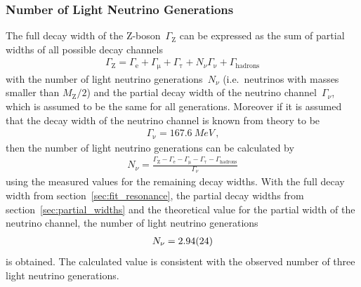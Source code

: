 \documentclass[11pt, a4paper]{article}
\numberwithin{equation}{section}
\begin{document}
\subsubsection{Number of Light Neutrino Generations}
The full decay width of the Z-boson~$\Gamma_\mathrm{Z}$ can be expressed as the sum of partial widths of all possible decay channels
\begin{align*}
	\Gamma_\mathrm{Z} = \Gamma_\mathrm{e} + \Gamma_\mathrm{\mu} + \Gamma_\mathrm{\tau} + N_\nu \Gamma_\mathrm{\nu} + \Gamma_\mathrm{hadrons}
\end{align*}
with the number of light neutrino generations~$N_\nu$ (i.e.\ neutrinos with masses smaller than $M_\mathrm{Z}/2$) and the partial decay width of the neutrino channel~$\Gamma_\nu$, which is assumed to be the same for all generations.
Moreover if it is assumed that the decay width of the neutrino channel is known from theory to be \cite{instructions}
\begin{align*}
	\Gamma_\mathrm{\nu} = \SI{167.6}{MeV} \,\text{,}
\end{align*}
then the number of light neutrino generations can be calculated by
\begin{align*}
N_\nu = \frac{\Gamma_\mathrm{Z} - \Gamma_\mathrm{e} - \Gamma_\mathrm{\mu} - \Gamma_\mathrm{\tau} - \Gamma_\mathrm{hadrons}}{\Gamma_\nu}
\end{align*}
using the measured values for the remaining decay widths.
With the full decay width from section~\ref{sec:fit_resonance}, the partial decay widths from section~\ref{sec:partial_widths} and the theoretical value for the partial width of the neutrino channel, the number of light neutrino generations
\begin{align*}
	N_\mathrm{\nu} = \num{2.94 +- 0.24}
\end{align*}
is obtained.
The calculated value is consistent with the observed number of three light neutrino generations.
\end{document}
